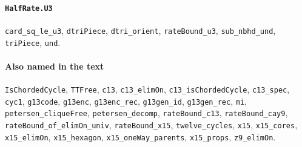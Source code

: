 \paragraph{\texttt{HalfRate.U3}}
{\small\raggedright \texttt{card\_sq\_le\_u3}, \texttt{dtriPiece}, \texttt{dtri\_orient}, \texttt{rateBound\_u3}, \texttt{sub\_nbhd\_und}, \texttt{triPiece}, \texttt{und}.\par}

\paragraph{Also named in the text}
{\small\raggedright \texttt{IsChordedCycle}, \texttt{TTFree}, \texttt{c13}, \texttt{c13\_elimOn}, \texttt{c13\_isChordedCycle}, \texttt{c13\_spec}, \texttt{cyc1}, \texttt{g13code}, \texttt{g13enc}, \texttt{g13enc\_rec}, \texttt{g13gen\_id}, \texttt{g13gen\_rec}, \texttt{mi}, \texttt{petersen\_cliqueFree}, \texttt{petersen\_decomp}, \texttt{rateBound\_c13}, \texttt{rateBound\_cay9}, \texttt{rateBound\_of\_elimOn\_univ}, \texttt{rateBound\_x15}, \texttt{twelve\_cycles}, \texttt{x15}, \texttt{x15\_cores}, \texttt{x15\_elimOn}, \texttt{x15\_hexagon}, \texttt{x15\_oneWay\_parents}, \texttt{x15\_props}, \texttt{z9\_elimOn}.\par}
